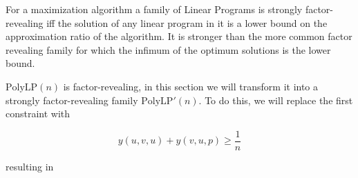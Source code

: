 For a maximization algorithm a family of Linear Programs is strongly factor-revealing iff the solution of any linear program in it is a lower bound on the approximation ratio of the algorithm. It is stronger than the more common factor revealing family for which the infimum of the optimum solutions is the lower bound.

$\mathrm{PolyLP}(n)$ is factor-revealing, in this section we will transform it into a strongly factor-revealing family $\mathrm{PolyLP'}(n)$. To do this, we will replace the first constraint with

\begin{equation}
	\label{ra-rank-eq-strong-factor}
	y(u,v,u)+y(v,u,p)\geq \frac{1}{n}
\end{equation}

resulting in


